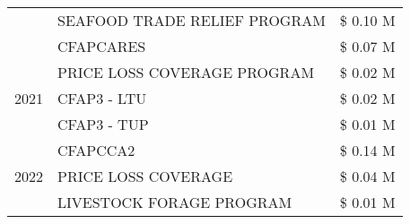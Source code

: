 \begin{tabular}{llr}
 & SEAFOOD TRADE RELIEF PROGRAM & \$ 0.10 M \\
 & CFAPCARES & \$ 0.07 M \\
\cline{1-3}
\multirow[t]{3}{*}{2021} & PRICE LOSS COVERAGE PROGRAM & \$ 0.02 M \\
 & CFAP3 - LTU & \$ 0.02 M \\
 & CFAP3 - TUP & \$ 0.01 M \\
\cline{1-3}
\multirow[t]{3}{*}{2022} & CFAPCCA2 & \$ 0.14 M \\
 & PRICE LOSS COVERAGE & \$ 0.04 M \\
 & LIVESTOCK FORAGE PROGRAM & \$ 0.01 M \\
\cline{1-3}
\bottomrule
\end{tabular}
